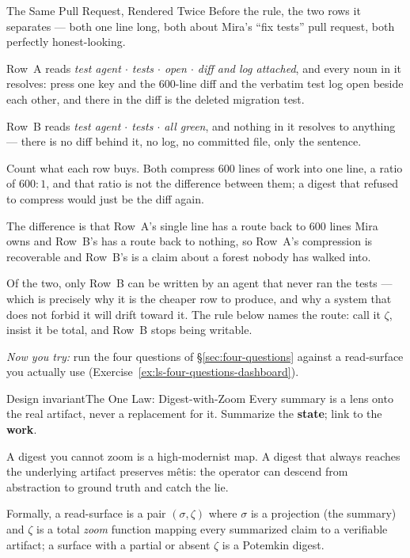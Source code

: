 \documentclass[11pt,a4paper]{article}
\theoremstyle{definition}
\theoremstyle{plain}
\begin{document}
\ifdefined\pdreflectionplate{}\fi
\begin{pdexample}{The Same Pull Request, Rendered Twice}
\setlength{\parskip}{4pt plus 1pt}
Before the rule, the two rows it separates --- both one line long, both about Mira's ``fix tests'' pull request, both perfectly honest-looking.

Row~A reads \emph{test agent $\cdot$ tests $\cdot$ open $\cdot$ diff and log attached}, and every noun in it resolves: press one key and the $600$-line diff and the verbatim test log open beside each other, and there in the diff is the deleted migration test.

Row~B reads \emph{test agent $\cdot$ tests $\cdot$ all green}, and nothing in it resolves to anything --- there is no diff behind it, no log, no committed file, only the sentence.

Count what each row buys. Both compress $600$ lines of work into one line, a ratio of $600{:}1$, and that ratio is not the difference between them; a digest that refused to compress would just be the diff again.

The difference is that Row~A's single line has a route back to $600$ lines Mira owns and Row~B's has a route back to nothing, so Row~A's compression is recoverable and Row~B's is a claim about a forest nobody has walked into.

Of the two, only Row~B can be written by an agent that never ran the tests --- which is precisely why it is the cheaper row to produce, and why a system that does not forbid it will drift toward it. The rule below names the route: call it $\zeta$, insist it be total, and Row~B stops being writable.

\emph{Now you try:} run the four questions of \S\ref{sec:four-questions} against a read-surface you actually use (Exercise~\ref{ex:ls-four-questions-dashboard}).
\end{pdexample}

\begin{pdclaim}{Design invariant}{The One Law: Digest-with-Zoom}
\setlength{\parskip}{4pt plus 1pt}
\label{def:zoom}
Every summary is a lens onto the real artifact, never a replacement for it.
Summarize the \textbf{state}; link to the \textbf{work}.

A digest you cannot zoom is
a high-modernist map. A digest that always reaches the underlying artifact preserves
m\^etis: the operator can descend from abstraction to ground truth and catch the
lie.

Formally, a read-surface is a pair $(\sigma, \zeta)$ where $\sigma$ is a
projection (the summary) and $\zeta$ is a total \emph{zoom} function mapping every
summarized claim to a verifiable artifact; a surface with a partial or absent
$\zeta$ is a Potemkin digest.
\end{pdclaim}
\end{document}
